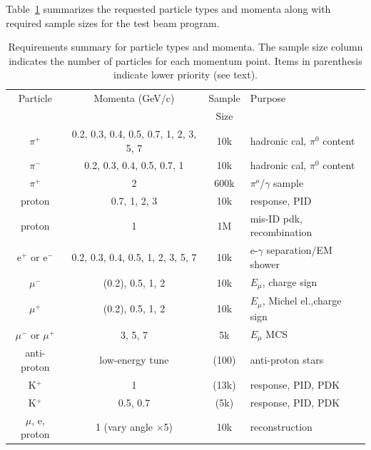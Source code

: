 Table~\ref{tab:runsum} summarizes the requested particle types and momenta along with 
required sample sizes for the test beam program.
\begin{table}[h]
\centering
\begin{tabular}{|c|c|c|l|}
\hline
Particle & Momenta (GeV/c) & Sample & Purpose \\ 
 &  &  Size &  \\ \hline \hline
$\pi^+$       & 0.2, 0.3, 0.4, 0.5, 0.7, 1, 2, 3, 5, 7     &  10k  & hadronic cal, $\pi^0$ content \\ \hline
$\pi^-$       &  0.2, 0.3, 0.4, 0.5, 0.7, 1     &  10k  & hadronic cal, $\pi^0$ content \\ \hline
$\pi^+$   &  2  &  600k & $\pi^o$/$\gamma$ sample \\ \hline
proton &  0.7, 1, 2, 3   &  10k & response, PID \\ \hline
proton &  1   &  1M & mis-ID pdk, recombination \\ \hline
e$^+$ or e$^-$       &    0.2, 0.3, 0.4, 0.5, 1, 2, 3, 5, 7        &    10k   & e-$\gamma$ separation/EM shower     \\ \hline
$\mu^-$  &   (0.2), 0.5, 1, 2  &  10k & $E_\mu$, charge sign \\ \hline
$\mu^+$ &   (0.2), 0.5, 1, 2   &  10k & $E_\mu$, Michel el.,charge sign  \\ \hline
$\mu^-$ or $\mu^+$ &   3, 5, 7  &  5k & $E_\mu$ MCS \\ \hline
anti-proton &  low-energy tune  &  (100) & anti-proton stars \\ \hline
K$^+$  & 1 & (13k)   &   response, PID, PDK  \\ \hline
K$^+$  & 0.5, 0.7 & (5k)   &   response, PID, PDK  \\ \hline \hline
$\mu$, e, proton  & 1 (vary angle $\times$5) & 10k  & reconstruction  \\ \hline
\end{tabular}
\caption{Requirements summary for particle types and momenta.
The sample size column indicates the number of particles for each momentum point.
Items in parenthesis indicate lower priority (see text).
}
\label{tab:runsum}
\end{table}


